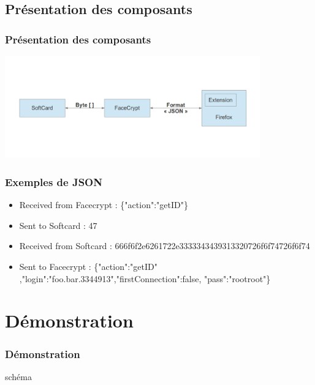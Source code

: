 \documentclass{beamer}
\begin{document}
\subsection{Présentation des composants}
\begin{frame}
    \frametitle{Présentation des composants}

 \includegraphics[width=11cm]{schema_dolby}



\end{frame}



\begin{frame}
    \frametitle{Exemples de JSON}
\begin{itemize}
\item Received from Facecrypt : \{"action":"getID"\}


\item Sent to Softcard : 47


\item Received from Softcard : 666f6f2e6261722e3333343439313320726f6f74726f6f74


\item Sent to Facecrypt : \{"action":"getID" ,"login":"foo.bar.3344913","firstConnection":false, "pass":"rootroot"\}
\end{itemize}

\end{frame}

\section{Démonstration}
\begin{frame}
\frametitle{Démonstration}
schéma
\end{frame}
\end{document}
